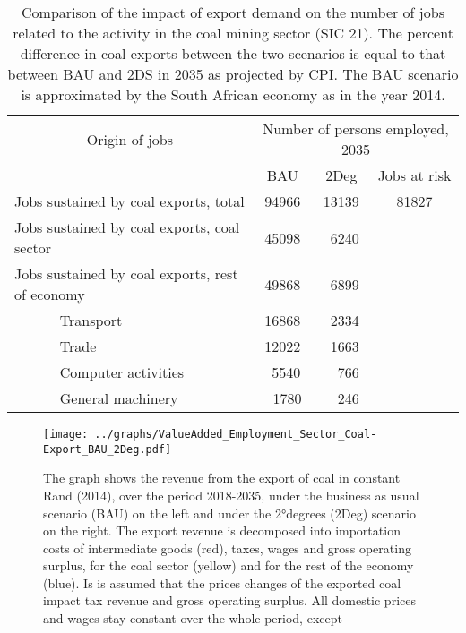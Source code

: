 \documentclass[12pt,english]{article}
\begin{document}
\begin{table}[ht]
	\centering
	\renewcommand*{\arraystretch}{1.15}
	\begin{tabular}{lp{20pt}lccc}
		\toprule
		\multicolumn{3}{c}{Origin of jobs} &\multicolumn{3}{c}{Number of persons employed, 2035} \\ 
		\multicolumn{3}{c}{} & BAU & 2Deg & Jobs at risk\\ 
		\midrule
		\multicolumn{3}{l}{Jobs sustained by coal exports, total}  		 & 94966 & 13139 & 81827 \\ 	
		\multicolumn{3}{l}{Jobs sustained by coal exports, coal sector}  & 45098 & \ 6240 & \\ 
		\multicolumn{3}{l}{Jobs sustained by coal exports, rest of economy}  & 49868  & \ 6899 & \\ 
		& 						 & Transport & 16868 &  \  2334 & \\ 
		& 						 & Trade & 12022 &  \ 1663  & \\ 
		& 						 & Computer activities & \, 5540 & \, \, 766  & \\
		& 						 & General machinery & \ \,1780 &  \, \, 246
		  & \\  
		\bottomrule
	\end{tabular}
	\caption{\label{coalExport_BAUvs2DS_2035}\small Comparison of the impact of export demand on the number of jobs related to the activity in the coal mining sector (SIC 21). The percent difference in coal exports between the two scenarios is equal to that between BAU and 2DS in 2035 as projected by CPI. The BAU scenario is approximated by the South African economy as in the year 2014.}
\end{table}

\begin{figure}[!h]
	\centering
	\hspace{-10pt}\texttt{[image: ../graphs/ValueAdded\_Employment\_Sector\_Coal-Export\_BAU\_2Deg.pdf]}
	\caption{\label{ValueAdded_Employment_Sector_Coal-Export_BAU_2Deg}\small The graph shows the revenue from the export of coal in constant Rand (2014), over the period 2018-2035, under the business as usual scenario (BAU) on the left and under the 2°degrees (2Deg) scenario on the right. The export revenue is decomposed into importation costs of intermediate goods (red), taxes, wages and gross operating surplus, for the coal sector (yellow) and for the rest of the economy (blue). Is is assumed that the prices changes of the exported coal impact tax revenue and gross operating surplus. All domestic prices and wages stay constant over the whole period, except  }
\end{figure}
\end{document}
